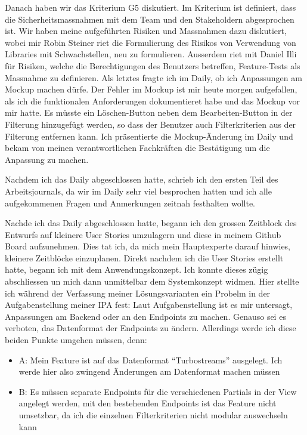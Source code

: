 Danach haben wir das Kriterium G5 diskutiert. Im Kriterium ist definiert, dass die Sicherheitsmassnahmen mit dem Team und den Stakeholdern
abgesprochen ist. Wir haben meine aufgeführten Risiken und Massnahmen dazu diskutiert, wobei mir Robin Steiner riet die Formulierung des Risikos von
Verwendung von Libraries mit Schwachstellen, neu zu formulieren. Ausserdem riet mit Daniel Illi für Risiken, welche die Berechtigungen des Benutzers betreffen,
Feature-Tests als Massnahme zu definieren. Als letztes fragte ich im Daily, ob ich Anpassungen am Mockup machen dürfe. Der Fehler im Mockup ist mir heute morgen aufgefallen, 
als ich die funktionalen Anforderungen dokumentieret habe und das Mockup vor mir hatte. Es müsste ein Löschen-Button neben dem Bearbeiten-Button in der Filterung hinzugefügt werden,
so dass der Benutzer auch Filterkriterien aus der Filterung entfernen kann. Ich präsentierte die Mockup-Änderung im Daily und bekam von meinen verantwortlichen Fachkräften
die Bestätigung um die Anpassung zu machen. 

Nachdem ich das Daily abgeschlossen hatte, schrieb ich den ersten Teil des Arbeitsjournals, da wir im Daily sehr viel besprochen hatten und ich
alle aufgekommenen Fragen und Anmerkungen zeitnah festhalten wollte.

Nachde ich das Daily abgeschlossen hatte, begann ich den grossen Zeitblock des Entwurfs auf kleinere User Stories umzulagern und diese in meinem Github Board aufzunehmen.
Dies tat ich, da mich mein Hauptexperte darauf hinwies, kleinere Zeitblöcke einzuplanen. Direkt nachdem ich die User Stories erstellt hatte, begann ich mit dem Anwendungskonzept.
Ich konnte dieses zügig abschliessen un mich dann unmittelbar dem Systemkonzept widmen. Hier stellte ich während der Verfassung meiner Lösungsvarianten ein Probelm in der Aufgabenstellung
meiner IPA fest: Laut Aufgabenstellung ist es mir untersagt, Anpassungen am Backend oder an den Endpoints zu machen. Genauso sei es verboten, das Datenformat der Endpoints zu ändern. Allerdings
werde ich diese beiden Punkte umgehen müssen, denn:

\begin{itemize}
    \item A: Mein Feature ist auf das Datenformat ``Turbostreams'' ausgelegt. Ich werde hier also zwingend Änderungen am Datenformat machen müssen
    \item B: Es müssen separate Endpoints für die verschiedenen Partials in der View angelegt werden, mit den bestehenden Endpoints ist das Feature nicht umsetzbar, da ich die einzelnen Filterkriterien nicht modular auswechseln kann
\end{itemize}

